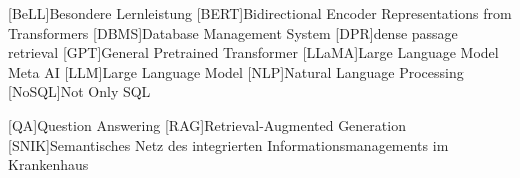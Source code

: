 \begin{acronym}[SPARQL]
[BeLL]{Besondere Lernleistung}
[BERT]{Bidirectional Encoder Representations from Transformers}
[DBMS]{Database Management System}
[DPR]{dense passage retrieval}
[GPT]{General Pretrained Transformer}
[LLaMA]{Large Language Model Meta AI}
[LLM]{Large Language Model}
[NLP]{Natural Language Processing}
[NoSQL]{Not Only SQL}

[QA]{Question Answering}
[RAG]{Retrieval-Augmented Generation}
[SNIK]{Semantisches Netz des integrierten Informationsmanagements im Krankenhaus}
\end{acronym}
